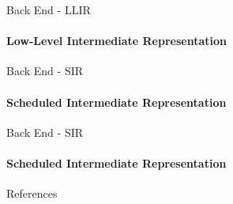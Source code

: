 \documentclass[en,16:9]{sdqbeamer}
\begin{document}
\begin{frame}{Back End - LLIR}
	\framesubtitle{Low-Level Intermediate Representation}
\end{frame}

\begin{frame}{Back End - SIR}
	\framesubtitle{Scheduled Intermediate Representation}
	
\end{frame}

\begin{frame}{Back End - SIR}
	\framesubtitle{Scheduled Intermediate Representation}
	
\end{frame}

\appendix
\beginbackup

\begin{frame}{References}
\printbibliography
\end{frame}


\backupend
\end{document}
